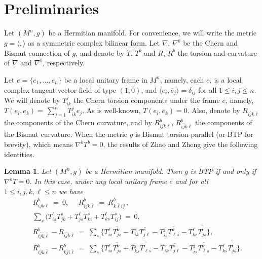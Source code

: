 \documentclass{amsart}
\newtheorem{lemma}{Lemma}
\begin{document}
\vspace{0.3cm}

\section{Preliminaries}

Let $(M^n,g)$ be a Hermitian manifold. For convenience, we will write the metric $g=\langle , \rangle$ as a symmetric complex bilinear form. Let $\nabla$, $\nabla^b$ be the Chern and Bismut connection of $g$, and denote by $T$, $T^b$ and $R$, $R^b$ the torsion and curvature of $\nabla$ and $\nabla^b$, respectively.


Let $e=\{ e_1, \ldots , e_n\}$ be a local unitary frame in $M^n$, namely, each $e_i$ is a local complex tangent vector field of type $(1,0)$, and $\langle e_i, \overline{e}_j\rangle =\delta_{ij}$ for all $1\leq i,j\leq n$. We will denote by $T^j_{ik}$ the Chern torsion components under the frame $e$, namely, $T(e_i,e_k)=\,\sum_{j=1}^nT^j_{ik} e_j$. As is well-known, $T(e_i,\overline{e}_k)=0$. Also, denote by $R_{i\bar{j}k\bar{\ell}}$ the components of the Chern curvature, and by $R^b_{ijk\bar{\ell}}$,  $R^b_{i\bar{j}k\bar{\ell}}$ the components of the Bismut curvature. When the metric $g$ is Bismut torsion-parallel (or BTP for brevity), which means $\nabla^bT^b=0$,  the results of Zhao and Zheng \cite{ZhaoZ24} give the following identities.


\begin{lemma} \label{lemma1}
Let $(M^n,g)$ be a Hermitian manifold. Then $g$ is BTP if and only if  $\nabla^bT=0$. In this case, under any local unitary frame $e$ and for all $1\leq i,j,k,\ell \leq n$  we have
\begin{eqnarray}
&& R^b_{ijk\bar{\ell}} \ = \ 0, \ \ \ \ \ \ R^b_{i\bar{j}k\bar{\ell}} \ = \ R^b_{k\bar{\ell}i\bar{j}} \,,  \label{eq:Rbsym}\\
&& \sum_{s} \big( T^{\ell}_{is} T^s_{jk} +  T^{\ell}_{js} T^s_{ki} + T^{\ell}_{ks} T^s_{ij}  \big) \ = \ 0, \label{eq:Jacobi} \\
&& R^b_{i\bar{j}k\bar{\ell}} - R_{i\bar{j}k\bar{\ell}} \ = \ \sum_s \big\{ T^{\ell}_{is} \overline{T^k_{js} } -  T^{s}_{ik} \overline{T^s_{j\ell } } - T^{j}_{is} \overline{T^k_{\ell s} } - T^{\ell}_{ks} \overline{T^i_{js} }  \big\}, \label{eq:Rb-R}\\
&&  R^b_{i\bar{j}k\bar{\ell}} - R^b_{k\bar{j}i\bar{\ell}} \ = \ \sum_s \big\{  T^{\ell}_{is} \overline{T^k_{js} } +  T^{j}_{ks} \overline{T^i_{\ell s} } -  T^{s}_{ik} \overline{T^s_{j\ell } } - T^{j}_{is} \overline{T^k_{\ell s} } - T^{\ell}_{ks} \overline{T^i_{js} }  \big\}. \label{eq:Rb-Rb}
\end{eqnarray}
\end{lemma}
\end{document}
